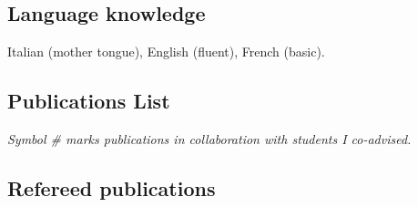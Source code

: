 \documentclass[11pt,a4paper]{article}
\begin{document}
\subsection*{Language knowledge}
Italian (mother tongue), English (fluent), French (basic).%


\pagebreak



\vspace{-4mm}

\subsection*{\LARGE{Publications  List}}

\vspace{3mm}

\textit{Symbol \# marks publications in collaboration with students I co-advised.}

\vspace{2mm}

\subsection*{ Refereed publications}
\end{document}
